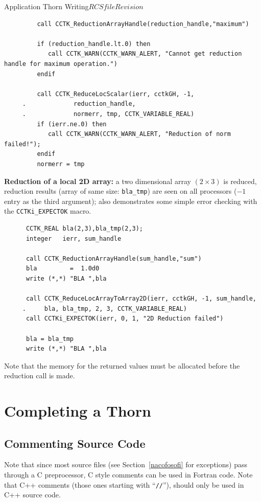 \begin{cactuspart}{Application Thorn Writing}{$RCSfile$}{$Revision$}
\begin{verbatim}
         call CCTK_ReductionArrayHandle(reduction_handle,"maximum")

         if (reduction_handle.lt.0) then
            call CCTK_WARN(CCTK_WARN_ALERT, "Cannot get reduction handle for maximum operation.")
         endif

         call CCTK_ReduceLocScalar(ierr, cctkGH, -1, 
     .             reduction_handle,
     .             normerr, tmp, CCTK_VARIABLE_REAL)
         if (ierr.ne.0) then
            call CCTK_WARN(CCTK_WARN_ALERT, "Reduction of norm failed!");
         endif
         normerr = tmp
\end{verbatim}


{\bf Reduction of a local 2D array:} a two dimensional array $(2\times3)$ is 
reduced, reduction results (array of same size: \texttt{bla\_tmp}) are seen
on all processors ($-1$ entry as the third argument); also demonstrates
some simple error checking with the \texttt{CCTKi\_EXPECTOK} macro.
\begin{verbatim}
      CCTK_REAL bla(2,3),bla_tmp(2,3);
      integer   ierr, sum_handle

      call CCTK_ReductionArrayHandle(sum_handle,"sum")
      bla         =  1.0d0
      write (*,*) "BLA ",bla

      call CCTK_ReduceLocArrayToArray2D(ierr, cctkGH, -1, sum_handle,
     .     bla, bla_tmp, 2, 3, CCTK_VARIABLE_REAL)
      call CCTKi_EXPECTOK(ierr, 0, 1, "2D Reduction failed")

      bla = bla_tmp
      write (*,*) "BLA ",bla
\end{verbatim}

Note that the memory for the returned values must be allocated before
the reduction call is made.



\chapter{Completing a Thorn}


\section{Commenting Source Code}

Note that since most source files (see Section~\ref{nacofosofi} for
exceptions) pass through a C preprocessor, C style comments can be
used in Fortran code. Note that C++ comments (those ones starting
with ``\texttt{//}''),
should only be used in C++ source code.


\end{cactuspart}
